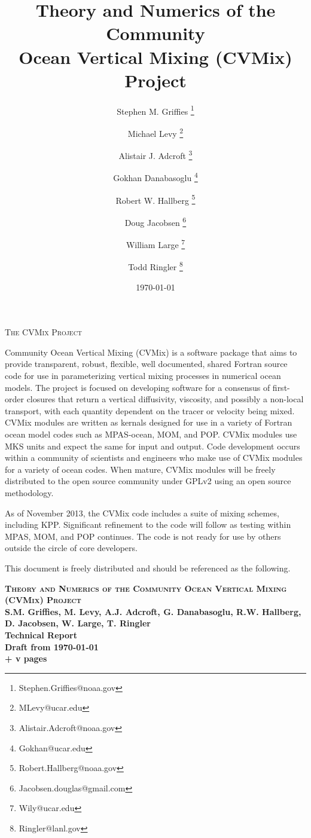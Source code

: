 \documentclass[10pt]{book}
\title{\sc Theory and Numerics of the Community 
         \\ Ocean Vertical Mixing (CVMix) Project}
\date{\today}
\author[$\star$]{Stephen M. Grif\/f\/ies \thanks{Stephen.Griffies@noaa.gov}}
\affil[$\star$]{NOAA/Geophysical Fluid Dynamics Laboratory, Princeton USA}
\author[$\dagger$]{Michael Levy \thanks{MLevy@ucar.edu}}
\affil[$\dagger$]{National Center for Atmospheric Research, Boulder USA}
\author[$\star$]{Alistair J. Adcroft \thanks{Alistair.Adcroft@noaa.gov}}
\author[$\dagger$]{Gokhan Danabasoglu \thanks{Gokhan@ucar.edu}}
\author[$\star$]{Robert W. Hallberg \thanks{Robert.Hallberg@noaa.gov}}
\author[$\triangle$]{Doug Jacobsen \thanks{Jacobsen.douglas@gmail.com}}
\affil[$\triangle$]{Los Alamos National Laboratory, Los Alamos USA}
\author[$\dagger$]{William Large \thanks{Wily@ucar.edu}}
\author[$\triangle$]{Todd Ringler \thanks{Ringler@lanl.gov}}
\begin{document}
\maketitle 
\thispagestyle{empty}

\begin{center}
{\scshape \Large The CVMix Project} 
\end{center}

{\sc Community Ocean Vertical Mixing (CVMix)} is a software package
that aims to provide transparent, robust, flexible, well documented,
shared Fortran source code for use in parameterizing vertical mixing
processes in numerical ocean models.  The project is focused on
developing software for a consensus of first-order closures that
return a vertical diffusivity, viscosity, and possibly a non-local
transport, with each quantity dependent on the tracer or velocity
being mixed.  CVMix modules are written as kernals designed for use in
a variety of Fortran ocean model codes such as MPAS-ocean, MOM, and
POP.  CVMix modules use MKS units and expect the same for input and
output.  Code development occurs within a community of scientists and
engineers who make use of CVMix modules for a variety of ocean codes.
When mature, CVMix modules will be freely distributed to the open
source community under GPLv2 using an open source methodology.

As of November 2013, the CVMix code includes a suite of mixing
schemes, including KPP. Significant refinement to the code will follow
as testing within MPAS, MOM, and POP continues.  The code is not ready
for use by others outside the circle of core developers.


\vspace{2cm}

\noindent
This document is freely distributed and should be referenced as the
following. \vspace{.25cm}

\noindent
{\bf 
{\scshape{Theory and Numerics of the Community Ocean Vertical
    Mixing (CVMix) Project}}
\\
S.M. Grif\/f\/ies, M. Levy, A.J. Adcroft, G. Danabasoglu,
R.W. Hallberg,  D. Jacobsen, W. Large, T. Ringler
\\
Technical Report
\\
Draft from \today 
\\
\pageref{LastPage} + v pages\\
}
\vspace{.4cm}
\end{document}
